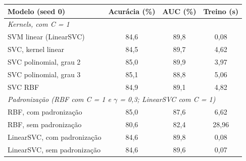 \begin{tabular}{lccc}
\toprule
Modelo (seed 0) & Acurácia (\%) & AUC (\%) & Treino (s) \\
\midrule
\multicolumn{4}{l}{\emph{Kernels, com C = 1}} \\
SVM linear (LinearSVC) & 84,6 & 89,8 & 0,08 \\
SVC, kernel linear & 84,5 & 89,7 & 4,62 \\
SVC polinomial, grau 2 & 85,0 & 89,9 & 3,97 \\
SVC polinomial, grau 3 & 85,1 & 88,8 & 5,06 \\
SVC RBF & 84,9 & 89,1 & 4,82 \\
\midrule
\multicolumn{4}{l}{\emph{Padronização (RBF com C = 1 e $\gamma$ = 0,3; LinearSVC com C = 1)}} \\
RBF, com padronização & 85,0 & 87,6 & 6,62 \\
RBF, sem padronização & 80,6 & 82,4 & 28,96 \\
LinearSVC, com padronização & 84,6 & 89,8 & 0,08 \\
LinearSVC, sem padronização & 84,6 & 89,6 & 0,07 \\
\bottomrule
\end{tabular}

